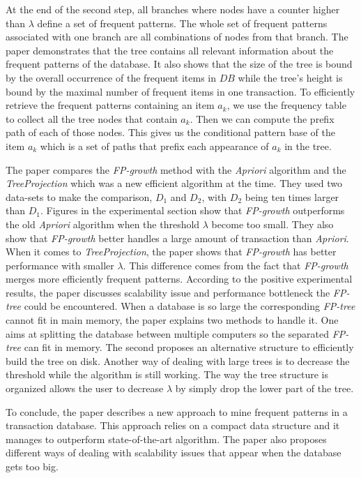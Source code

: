 \documentclass{article}
\begin{document}
At the end of the second step, all branches where nodes have a counter higher than $\lambda$ define a set of frequent patterns.
The whole set of frequent patterns associated with one branch are all combinations of nodes from that branch.
The paper demonstrates that the tree contains all relevant information about the frequent patterns of the database.
It also shows that the size of the tree is bound by the overall occurrence of the frequent items in $DB$ while the
tree's height is bound by the maximal number of frequent items in one transaction.
To efficiently retrieve the frequent patterns containing an item $a_k$, we use the frequency table to collect all the tree nodes that contain $a_k$.
Then we can compute the prefix path of each of those nodes.
This gives us the conditional pattern base of the item $a_k$ which is a set of paths that prefix each appearance of $a_k$ in the tree.

The paper compares the \textit{FP-growth} method with the \textit{Apriori} algorithm and the \textit{TreeProjection} which was a new efficient algorithm at the time.
They used two data-sets to make the comparison, $D_1$ and $D_2$, with $D_2$ being ten times larger than $D_1$.
Figures in the experimental section show that \textit{FP-growth} outperforms the old \textit{Apriori} algorithm when the threshold $\lambda$ become too small.
They also show that \textit{FP-growth} better handles a large amount of transaction than \textit{Apriori}.
When it comes to \textit{TreeProjection}, the paper shows that \textit{FP-growth} has better performance with smaller $\lambda$.
This difference comes from the fact that \textit{FP-growth} merges more efficiently frequent patterns.
According to the positive experimental results, the paper discusses scalability issue and performance bottleneck the \textit{FP-tree} could be encountered.
When a database is so large the corresponding \textit{FP-tree} cannot fit in main memory, the paper explains two methods to handle it.
One aims at splitting the database between multiple computers so the separated \textit{FP-tree} can fit in memory.
The second proposes an alternative structure to efficiently build the tree on disk.
Another way of dealing with large trees is to decrease the threshold while the algorithm is still working.
The way the tree structure is organized allows the user to decrease $\lambda$ by simply drop the lower part of the tree. 

To conclude, the paper describes a new approach to mine frequent patterns in a transaction database.
This approach relies on a compact data structure and it manages to outperform state-of-the-art algorithm.
The paper also proposes different ways of dealing with scalability issues that appear when the database gets too big. 
\end{document}
